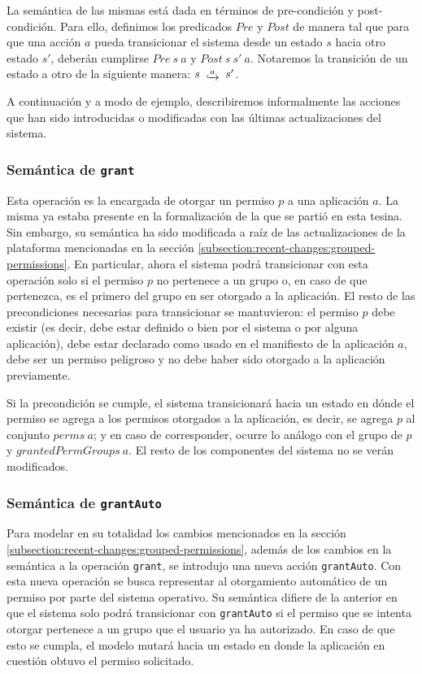 La semántica de las mismas está dada en términos de pre-condición y post-condición. Para ello,
definimos los predicados $Pre$ y $Post$ de manera tal que para que una acción $a$ pueda transicionar
el sistema desde un estado $s$ hacia otro estado $s'$, deberán cumplirse $Pre\ s\ a$ y $Post\ s\ s'\
    a$. Notaremos la transición de un estado a otro de la siguiente manera: $s\ \step{a}\ s'$.

A continuación y a modo de ejemplo, describiremos informalmente las acciones que han sido
introducidas o modificadas con las últimas actualizaciones del sistema.

\subsubsection{Semántica de \texttt{grant}}

Esta operación es la encargada de otorgar un permiso $p$ a una aplicación $a$. La misma ya estaba
presente en la formalización de la que se partió en esta tesina. Sin embargo, su semántica ha sido
modificada a raíz de las actualizaciones de la plataforma mencionadas en la sección
\ref{subsection:recent-changes:grouped-permissions}. En particular, ahora el sistema podrá
transicionar con esta operación solo si  el permiso $p$ no pertenece a un grupo o, en caso de que
pertenezca, es el primero del grupo en ser otorgado a la aplicación. El resto de las precondiciones
necesarias para transicionar se mantuvieron: el permiso $p$ debe existir (es decir, debe estar
definido o bien por el sistema o por alguna aplicación), debe estar declarado como usado en el
manifiesto de la aplicación $a$, debe ser un permiso peligroso y no debe haber sido otorgado a la
aplicación previamente.

Si la precondición se cumple, el sistema transicionará hacia un estado en dónde el permiso se agrega
a los permisos otorgados a la aplicación, es decir, se agrega $p$ al conjunto $perms\ a$; y en caso
de corresponder, ocurre lo análogo con el grupo de $p$ y $grantedPermGroups\ a$. El resto de los
componentes del sistema no se verán modificados.

\subsubsection{Semántica de \texttt{grantAuto}}

Para modelar en su totalidad los cambios mencionados en la sección
\ref{subsection:recent-changes:grouped-permissions}, además de los cambios en la semántica a la
operación \texttt{grant}, se introdujo una nueva acción \texttt{grantAuto}. Con esta nueva operación
se busca representar al otorgamiento automático de un permiso por parte del sistema operativo. Su
semántica difiere de la anterior en que el sistema solo podrá transicionar con \texttt{grantAuto} si
el permiso que se intenta otorgar pertenece a un grupo que el usuario ya ha autorizado. En caso de
que esto se cumpla, el modelo mutará hacia un estado en donde la aplicación en cuestión obtuvo el
permiso solicitado.

